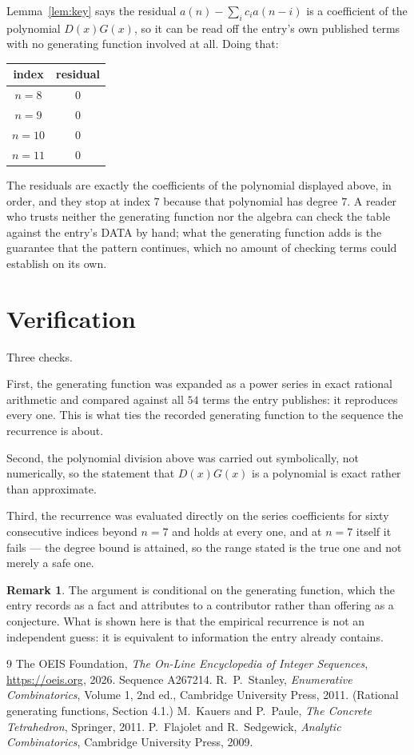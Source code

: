 \documentclass[11pt,a4paper]{article}
\theoremstyle{plain}
\theoremstyle{definition}
\newtheorem{remark}[theorem]{Remark}
\begin{document}
Lemma~\ref{lem:key} says the residual $a(n)-\sum_ic_ia(n-i)$ is a coefficient of the
polynomial $D(x)G(x)$, so it can be read off the entry's own published terms with no
generating function involved at all. Doing that:
\begin{center}
\begin{tabular}{cc}
index & residual \\ \hline
$n=8$ & $0$ \\
$n=9$ & $0$ \\
$n=10$ & $0$ \\
$n=11$ & $0$
\end{tabular}
\end{center}
The residuals are exactly the coefficients of the polynomial displayed above, in order, and
they stop at index $7$ because that polynomial has degree $7$. A reader who trusts
neither the generating function nor the algebra can check the table against the entry's DATA
by hand; what the generating function adds is the guarantee that the pattern continues, which
no amount of checking terms could establish on its own.

\section{Verification}

Three checks.

First, the generating function was expanded as a power series in exact rational arithmetic and
compared against all $54$ terms the entry publishes: it reproduces every one. This is
what ties the recorded generating function to the sequence the recurrence is about.

Second, the polynomial division above was carried out symbolically, not numerically, so the
statement that $D(x)G(x)$ is a polynomial is exact rather than approximate.

Third, the recurrence was evaluated directly on the series coefficients for sixty consecutive
indices beyond $n=7$ and holds at every one, and at $n=7$ itself it fails --- the
degree bound is attained, so the range stated is the true one and not merely a safe one.

\begin{remark}
The argument is conditional on the generating function, which the entry records as a fact and
attributes to a contributor rather than offering as a conjecture. What is shown here is that
the empirical recurrence is not an independent guess: it is equivalent to information the
entry already contains.
\end{remark}

\begin{thebibliography}{9}
 The OEIS Foundation, \emph{The On-Line Encyclopedia of Integer
Sequences}, \url{https://oeis.org}, 2026. Sequence A267214.
 R.~P.~Stanley, \emph{Enumerative Combinatorics}, Volume 1, 2nd ed.,
Cambridge University Press, 2011. (Rational generating functions, Section 4.1.)
 M.~Kauers and P.~Paule, \emph{The Concrete Tetrahedron}, Springer, 2011.
 P.~Flajolet and R.~Sedgewick, \emph{Analytic Combinatorics}, Cambridge
University Press, 2009.
\end{thebibliography}
\end{document}
